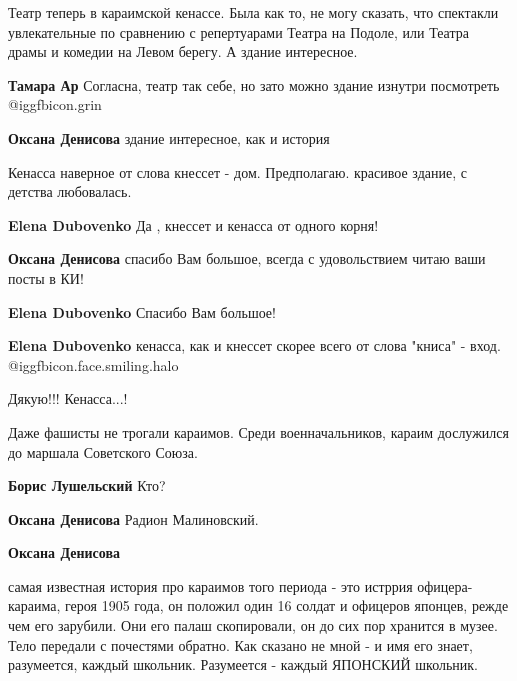 \begin{itemize}

Театр теперь в караимской кенассе. Была как то, не могу сказать, что спектакли
увлекательные по сравнению с репертуарами Театра на Подоле, или Театра драмы и
комедии на Левом берегу. А здание интересное.

\begin{itemize} %
\textbf{Тамара Ар} Согласна, театр так себе, но зато можно здание изнутри посмотреть @igg{fbicon.grin} 

\textbf{Оксана Денисова} здание интересное, как и история
\end{itemize} %


Кенасса наверное от слова кнессет - дом. Предполагаю.  красивое здание, с
детства любовалась.

\begin{itemize} %
\textbf{Elena Dubovenko} Да , кнессет и кенасса от одного корня!

\textbf{Оксана Денисова} спасибо Вам большое, всегда с удовольствием читаю ваши посты в КИ!

\textbf{Elena Dubovenko} Спасибо Вам большое!

\textbf{Elena Dubovenko} кенасса, как и кнессет скорее всего от слова "книса" - вход.  @igg{fbicon.face.smiling.halo} 
\end{itemize} %

Дякую!!! Кенасса...!

Даже фашисты не трогали караимов.
Среди военначальников, караим дослужился до маршала Советского Союза.

\begin{itemize} %
\textbf{Борис Лушельский} Кто?

\textbf{Оксана Денисова}
Радион Малиновский.

\textbf{Оксана Денисова} 

самая известная история про караимов того периода - это истррия
офицера-караима, героя 1905 года, он положил один 16 солдат и офицеров японцев,
режде чем его зарубили. Они его палаш скопировали, он до сих пор хранится в
музее. Тело передали с почестями обратно. Как сказано не мной - и имя его
знает, разумеется, каждый школьник. Разумеется - каждый ЯПОНСКИЙ школьник.


\end{itemize}
\end{itemize}
